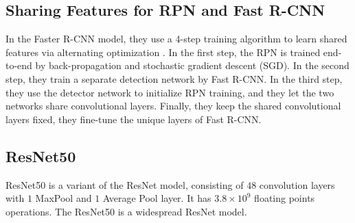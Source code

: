 \subsection{Sharing Features for RPN and Fast R-CNN}
In the Faster R-CNN model, they use a 4-step training algorithm to learn shared features via alternating optimization \cite{f-rcnn}. In the first step, the RPN is trained end-to-end by back-propagation and stochastic gradient descent (SGD). In the second step, they train a separate detection network by Fast R-CNN. In the third step, they use the detector network to initialize RPN training, and they let the two networks share convolutional layers. Finally, they keep the shared convolutional layers fixed, they fine-tune the unique layers of Fast R-CNN.

\subsection{ResNet50}
ResNet50 is a variant of the ResNet model, consisting of $48$ convolution layers with $1$ MaxPool and $1$ Average Pool layer. It has $3.8 \times 10^9$ floating points operations. The ResNet50 is a widespread ResNet model. \\
